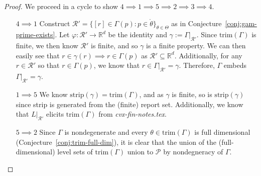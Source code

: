 \documentclass[12pt]{article}
\newcommand{\Comments}{1}
\newcommand{\mynote}[2]{\ifnum\Comments=1\textcolor{#1}{#2}\fi}
\newcommand{\jessie}[1]{\mynote{purple}{[JF: #1]}}
\newcommand{\reals}{\mathbb{R}}
\renewcommand{\P}{\mathcal{P}}
\newcommand{\R}{\mathcal{R}}
\newcommand{\inter}[1]{\mathring{#1}}%
\newcommand{\trim}{\mathrm{trim}}
\newcommand{\strip}{\mathrm{strip}}
\begin{document}
\begin{proof}
We proceed in a cycle to show $4 \implies 1 \implies 5 \implies 2 \implies 3 \implies 4$.

\begin{enumerate}


\item[$4 \implies 1$] 
Construct $\R' = \{ [r] \in \Gamma(p): p \in \inter{\theta} \}_{\theta\in\Theta}$ as in Conjecture~\ref{conj:gam-prime-exists}.
Let $\varphi : \R' \to \reals^d$ be the identity and $\gamma := \Gamma|_{\R'}$.
Since $\trim(\Gamma)$ is finite, we then know $\R'$ is finite, and so $\gamma$ is a finite property.
We can then easily see that $r \in \gamma(r) \implies r \in \Gamma(p)$ as $\R' \subseteq \reals^d$.
Additionally, for any $r \in \R'$ so that $r \in \Gamma(p)$, we know that $r \in \Gamma|_{\R'} = \gamma$.
Therefore, $\Gamma$ embeds $\Gamma|_{\R'} = \gamma$.




\item [$1 \implies 5$]
We know $\strip(\gamma) = \trim(\Gamma)$, and as $\gamma$ is finite, so is $\strip(\gamma)$ since strip is generated from the (finite) report set.
Additionally, we know that $L|_{\R'}$ elicits $\trim(\Gamma)$ from \emph{cvx-fin-notes.tex}.

\item [$5 \implies 2$]
Since $\Gamma$ is nondegenerate and every $\theta \in \trim(\Gamma)$ is full dimensional (Conjecture~\ref{conj:trim-full-dim}), it is clear that the union of the (full-dimensional) level sets of $\trim(\Gamma)$ union to $\P$ by nondegneracy of $\Gamma$.



\end{enumerate}
\end{proof}
\end{document}
